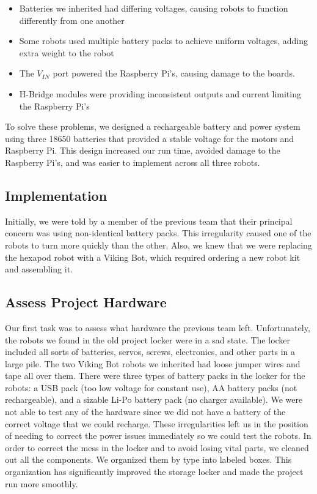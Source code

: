 \documentclass[a4paper,12pt]{article}
\begin{document}
	\begin{itemize}
		\item Batteries we inherited had differing voltages, causing robots to function differently from one another
		\item Some robots used multiple battery packs to achieve uniform voltages, adding extra weight to the robot
		\item The $V_{IN}$ port powered the Raspberry Pi's, causing damage to the boards.
		\item H-Bridge modules were providing inconsistent outputs and current limiting the Raspberry Pi's
	\end{itemize}
	
	To solve these problems, we designed a rechargeable battery and power system using three 18650 batteries that provided a stable voltage for the motors and Raspberry Pi. This design increased our run time, avoided damage to the Raspberry Pi's, and was easier to implement across all three robots.
	
\subsection{Implementation}
	Initially, we were told by a member of the previous team that their principal concern was using non-identical battery packs. This irregularity caused one of the robots to turn more quickly than the other. Also, we knew that we were replacing the hexapod robot with a Viking Bot, which required ordering a new robot kit and assembling it.

\subsection{Assess Project Hardware}
	Our first task was to assess what hardware the previous team left. Unfortunately, the robots we found in the old project locker were in a sad state. The locker included all sorts of batteries, servos, screws, electronics, and other parts in a large pile. The two Viking Bot robots we inherited had loose jumper wires and tape all over them. There were three types of battery packs in the locker for the robots: a USB pack (too low voltage for constant use), AA battery packs (not rechargeable), and a sizable Li-Po battery pack (no charger available). We were not able to test any of the hardware since we did not have a battery of the correct voltage that we could recharge. These irregularities left us in the position of needing to correct the power issues immediately so we could test the robots. In order to correct the mess in the locker and to avoid losing vital parts, we cleaned out all the components. We organized them by type into labeled boxes. This organization has significantly improved the storage locker and made the project run more smoothly.
	
\end{document}
